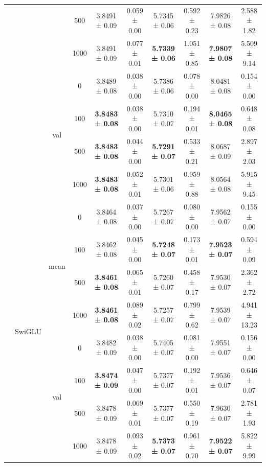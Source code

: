 \documentclass{article}
\begin{document}
\begin{table}[htbp]
{\begin{tabular}{c|c|c|c|c|c|c|c|c|c}
       &        &        & 500    & 3.8491 ± 0.09 & 0.059 ± 0.00 & 5.7345 ± 0.06 & 0.592 ± 0.23 & 7.9826 ± 0.08 & 2.588 ± 1.82 \\
       &        &        & 1000   & 3.8491 ± 0.09 & 0.077 ± 0.01 & \textbf{5.7339 ± 0.06} & 1.051 ± 0.85 & \textbf{7.9807 ± 0.08} & 5.509 ± 9.14 \\
\cmidrule{3-10}       &        & \multicolumn{1}{c|}{\multirow{4}[2]{*}{val}} & 0      & 3.8489 ± 0.08 & 0.038 ± 0.00 & 5.7386 ± 0.06 & 0.078 ± 0.00 & 8.0481 ± 0.08 & 0.154 ± 0.00 \\
       &        &        & 100    & \textbf{3.8483 ± 0.08} & 0.038 ± 0.00 & 5.7310 ± 0.07 & 0.194 ± 0.01 & \textbf{8.0465 ± 0.08} & 0.648 ± 0.08 \\
       &        &        & 500    & \textbf{3.8483 ± 0.08} & 0.044 ± 0.00 & \textbf{5.7291 ± 0.07} & 0.533 ± 0.21 & 8.0687 ± 0.09 & 2.897 ± 2.03 \\
       &        &        & 1000   & \textbf{3.8483 ± 0.08} & 0.052 ± 0.01 & 5.7301 ± 0.06 & 0.959 ± 0.88 & 8.0564 ± 0.08 & 5.915 ± 9.45 \\
\cmidrule{2-10}       & \multicolumn{1}{c|}{\multirow{8}[4]{*}{SwiGLU}} & \multicolumn{1}{c|}{\multirow{4}[2]{*}{mean}} & 0      & 3.8464 ± 0.08 & 0.037 ± 0.00 & 5.7267 ± 0.07 & 0.080 ± 0.00 & 7.9562 ± 0.07 & 0.155 ± 0.00 \\
       &        &        & 100    & 3.8462 ± 0.08 & 0.045 ± 0.00 & \textbf{5.7248 ± 0.07} & 0.173 ± 0.01 & \textbf{7.9523 ± 0.07} & 0.594 ± 0.09 \\
       &        &        & 500    & \textbf{3.8461 ± 0.08} & 0.065 ± 0.01 & 5.7260 ± 0.07 & 0.458 ± 0.17 & 7.9530 ± 0.07 & 2.362 ± 2.72 \\
       &        &        & 1000   & \textbf{3.8461 ± 0.08} & 0.089 ± 0.02 & 5.7257 ± 0.07 & 0.799 ± 0.62 & 7.9539 ± 0.07 & 4.941 ± 13.23 \\
\cmidrule{3-10}       &        & \multicolumn{1}{c|}{\multirow{4}[2]{*}{val}} & 0      & 3.8482 ± 0.09 & 0.038 ± 0.00 & 5.7405 ± 0.07 & 0.081 ± 0.00 & 7.9551 ± 0.07 & 0.156 ± 0.00 \\
       &        &        & 100    & \textbf{3.8474 ± 0.09} & 0.047 ± 0.00 & 5.7377 ± 0.07 & 0.192 ± 0.01 & 7.9536 ± 0.07 & 0.646 ± 0.07 \\
       &        &        & 500    & 3.8478 ± 0.09 & 0.069 ± 0.01 & 5.7377 ± 0.07 & 0.550 ± 0.19 & 7.9630 ± 0.07 & 2.781 ± 1.93 \\
       &        &        & 1000   & 3.8478 ± 0.09 & 0.093 ± 0.02 & \textbf{5.7373 ± 0.07} & 0.961 ± 0.70 & \textbf{7.9522 ± 0.07} & 5.822 ± 9.99 \\
\bottomrule
\end{tabular}%
    }
  \label{tab:TSP result}%
\end{table}%
\end{document}
